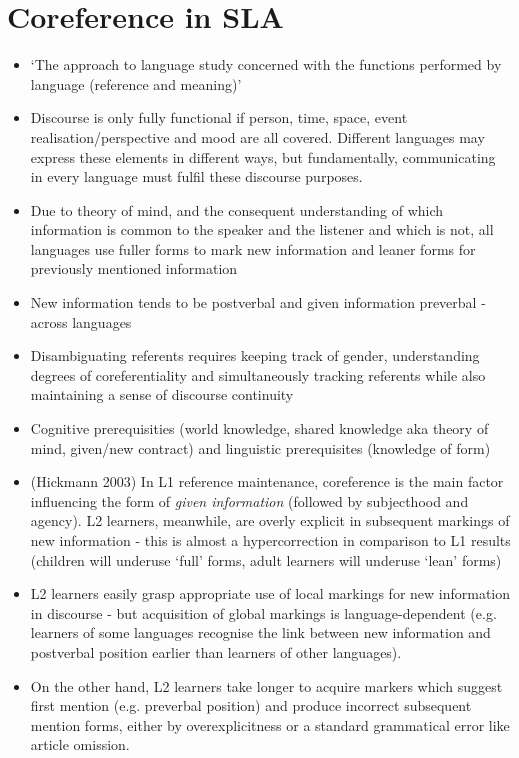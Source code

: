 \documentclass{article}
\begin{document}
\section{Coreference in SLA}
\begin{itemize}
    \item `The approach to language study concerned with the functions performed by language (reference and meaning)'
    \item Discourse is only fully functional if person, time, space, event realisation/perspective and mood are all covered. Different languages may express these elements in different ways, but fundamentally, communicating in every language must fulfil these discourse purposes.
    \item Due to theory of mind, and the consequent understanding of which information is common to the speaker and the listener and which is not, all languages use fuller forms to mark new information and leaner forms for previously mentioned information
    \item New information tends to be postverbal and given information preverbal - across languages
    \item Disambiguating referents requires keeping track of gender, understanding degrees of coreferentiality and simultaneously tracking referents while also maintaining a sense of discourse continuity
    \item Cognitive prerequisities (world knowledge, shared knowledge aka theory of mind, given/new contract) and linguistic prerequisites (knowledge of form)
    \item (Hickmann 2003) In L1 reference maintenance, coreference is the main factor influencing the form of \textit{given information} (followed by subjecthood and agency). L2 learners, meanwhile, are overly explicit in subsequent markings of new information - this is almost a hypercorrection in comparison to L1 results (children will underuse `full' forms, adult learners will underuse `lean' forms)
    \item L2 learners easily grasp appropriate use of local markings for new information in discourse - but acquisition of global markings is language-dependent (e.g. learners of some languages recognise the link between new information and postverbal position earlier than learners of other languages).
    \item On the other hand, L2 learners take longer to acquire markers which suggest first mention (e.g. preverbal position) and produce incorrect subsequent mention forms, either by overexplicitness or a standard grammatical error like article omission.
\end{itemize}
\end{document}
